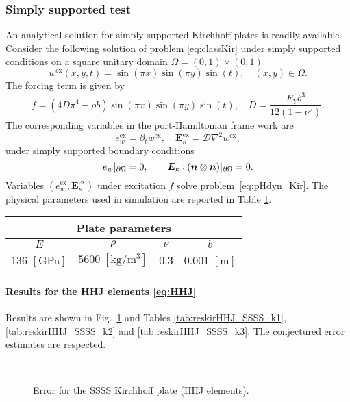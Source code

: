 \subsubsection{Simply supported test}
An analytical solution for simply supported Kirchhoff plates is readily available. Consider the following solution of problem \eqref{eq:classKir} under simply supported conditions on a square unitary domain $\Omega = (0,1)\times (0,1)$
\[
w^{\text{ex}}(x,y,t) = \sin(\pi x) \sin(\pi y) \sin(t), \quad  (x, y) \in \Omega.
\] 
The forcing term is given by  
\[
f = (4 D \pi^4 - \rho b) \sin(\pi x) \sin(\pi y) \sin(t), \quad D = \frac{E_Y b^3}{12 (1-\nu^2)}.
\]
The corresponding variables in the port-Hamiltonian frame work are
\[
e_w^{\text{ex}} = \partial_t w^{\text{ex}}, \quad \bm{E}_\kappa^{\text{ex}} = \mathcal{D} \nabla^2 w^{\text{ex}},
\]
under simply supported boundary conditions
\[
e_w\vert_{\partial\Omega} = 0, \qquad \bm{E}_\kappa \cddot (\bm{n} \otimes \bm{n})\vert_{\partial\Omega} = 0.
\]
Variables $(e_w^{\text{ex}}, \bm{E}_\kappa^{\text{ex}})$ under excitation $f$ solve problem~\eqref{eq:pHdyn_Kir}. The physical parameters used in simulation are reported in Table \ref{tab:parKir}. 

\begin{table}[htbp]
	\centering
	\begin{tabular}{cccc}
		\hline 
		\multicolumn{4}{c}{Plate parameters} \\ 
		\hline 
		$E$ & $\rho$ & $\nu$  & $b$ \\
		136 $[\textrm{GPa}]$ & $5600\; [\textrm{kg}/\textrm{m}^3]$ & 0.3 &  0.001 $[\textrm{m}]$\\ 
		\hline 
	\end{tabular} 
	\captionsetup{width=0.95\linewidth}
	\vspace{1mm}
	\label{tab:parKir}
\end{table}


\paragraph{Results for the HHJ elements \eqref{eq:HHJ}}
Results are shown in Fig.~\ref{fig:errorHHJ_SSSS} and Tables \ref{tab:reskirHHJ_SSSS_k1}, \ref{tab:reskirHHJ_SSSS_k2} and \ref{tab:reskirHHJ_SSSS_k3}. The conjectured error estimates are respected.

\begin{figure}[htbp]%
	\centering
	\hspace{8pt}%
	 \\
	\caption{Error for the SSSS Kirchhoff plate (HHJ elements).}%
	\label{fig:errorHHJ_SSSS}%
\end{figure}



